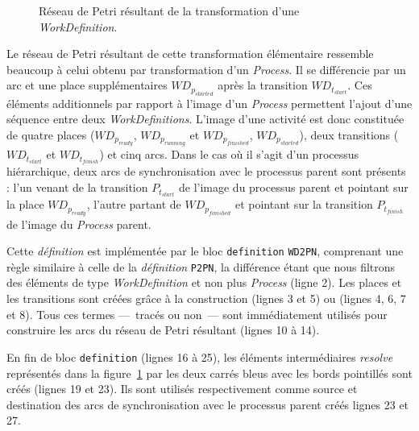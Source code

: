 \begin{figure}[h]
  \begin{center}
    
  \end{center}
  \caption{Réseau de Petri résultant de la transformation d'une \emph{WorkDefinition}.}
  \label{fig:PNWorkDefinition}
\end{figure}

Le réseau de Petri résultant de cette transformation élémentaire ressemble
beaucoup à celui obtenu par transformation d'un \emph{Process}. Il se
différencie par un arc et une place supplémentaires $WD_{p_{started}}$ après
la transition $WD_{t_{start}}$. Ces éléments additionnels par rapport à l'image
d'un \emph{Process} permettent l'ajout d'une séquence entre deux
\emph{WorkDefinitions}.  L'image d'une activité est donc constituée de quatre
places ($WD_{p_{ready}}$, $WD_{p_{running}}$ et $WD_{p_{finished}}$,
$WD_{p_{started}}$), deux transitions ($WD_{t_{start}}$ et $WD_{t_{finish}}$)
et cinq arcs.  Dans le cas où il s'agit d'un processus hiérarchique, deux arcs
de synchronisation avec le processus parent sont présents : l'un venant de la
transition $P_{t_{start}}$ de l'image du processus parent et pointant sur la
place $WD_{p_{ready}}$, l'autre partant de $WD_{p_{finished}}$ et pointant sur
la transition $P_{t_{finish}}$ de l'image du \emph{Process} parent.

Cette \emph{définition} est implémentée par le bloc \texttt{definition}
\texttt{WD2PN}, comprenant une règle similaire à celle de la \emph{définition}
\texttt{P2PN}, la différence étant que nous filtrons des éléments de type
\emph{WorkDefinition} et non plus \emph{Process} (ligne 2). Les places et les
transitions sont créées grâce à la construction  (lignes 3 et 5)
ou {\via}  (lignes 4, 6, 7 et 8). Tous ces termes ---~tracés ou non~--- sont immédiatement
utilisés pour construire les arcs du réseau de Petri résultant (lignes 10 à
14).

En fin de bloc \texttt{definition} (lignes 16 à 25), les éléments
intermédiaires \emph{resolve} représentés dans la
figure~\ref{fig:PNWorkDefinition} par les deux carrés bleus avec les bords
pointillés sont créés (lignes 19 et 23). Ils sont utilisés respectivement comme
source et destination des arcs de synchronisation avec le processus parent
créés lignes 23 et 27.

\begin{figure}[h]
  \begin{center}
    
  \end{center}
\end{figure}


